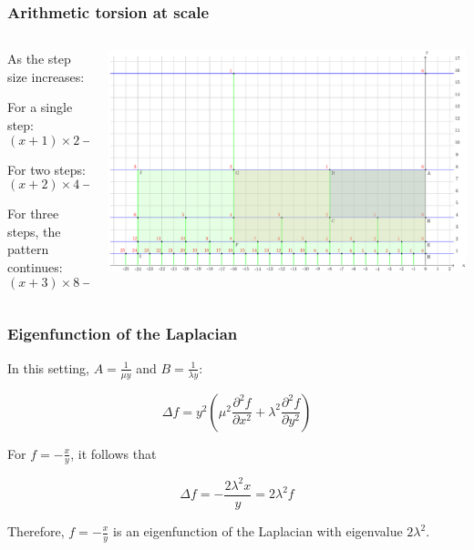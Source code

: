 \documentclass[aspectratio=169]{beamer}
\begin{document}
\begin{frame}
    \frametitle{Arithmetic torsion at scale}
    \begin{columns}
        \begin{column}{0.5\textwidth}
            As the step size increases:

            For a single step:
            \begin{equation}
            (x + 1) \times 2 - (x \times 2 + 1) = 1
            \end{equation}

            For two steps:
            \begin{equation}
            (x + 2) \times 4 - (x \times 4 + 2) = 6
            \end{equation}

            For three steps, the pattern continues:
            \begin{equation}
            (x + 3) \times 8 - (x \times 8 + 3) = 21
            \end{equation}
        \end{column}
        \begin{column}{0.5\textwidth}
            \begin{center}
                \includegraphics[width=1.0\textwidth]{../images/17-area-formula}
            \end{center}
        \end{column}
    \end{columns}
\end{frame}

\begin{frame}
    \frametitle{Eigenfunction of the Laplacian}
    In this setting, \(A = \frac{1}{\mu y}\) and \(B = \frac{1}{\lambda y}\):

    \[
        \Delta f = y^2 \left(\mu^2 \frac{\partial^2 f}{\partial x^2} + \lambda^2 \frac{\partial^2 f}{\partial y^2}\right)
    \]

    For \(f = -\frac{x}{y}\), it follows that

    \[
        \Delta f = - \frac{2 \lambda^2 x}{y} = 2 \lambda^2 f
    \]

    Therefore, \(f = -\frac{x}{y}\) is an eigenfunction of the Laplacian with eigenvalue \(2\lambda^2\).
\end{frame}
\end{document}
